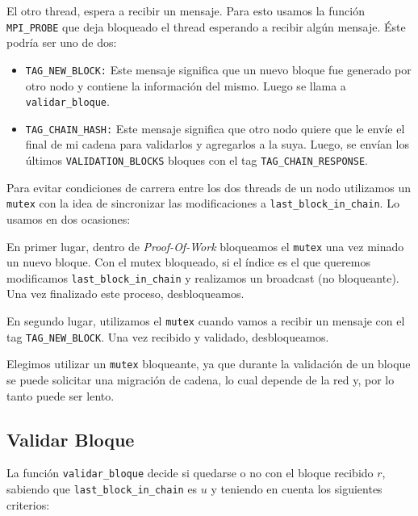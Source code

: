 El otro thread, espera a recibir un mensaje. Para esto usamos la función \texttt{MPI\_PROBE} que deja bloqueado el thread esperando a recibir algún mensaje. \'Este podría ser uno de dos: 
\begin{itemize}
	\item \texttt{TAG\_NEW\_BLOCK:} Este mensaje significa que un nuevo bloque fue generado por otro nodo y contiene la información del mismo. Luego se llama a \texttt{validar\_bloque}.
	\item \texttt{TAG\_CHAIN\_HASH:} Este mensaje significa que otro nodo quiere que le envíe el final de mi cadena para validarlos y agregarlos a la suya. Luego, se envían los últimos \texttt{VALIDATION\_BLOCKS} bloques con el tag \texttt{TAG\_CHAIN\_RESPONSE}.
\end{itemize}

Para evitar condiciones de carrera entre los dos threads de un nodo utilizamos un \texttt{mutex} con la idea de sincronizar las modificaciones a \texttt{last\_block\_in\_chain}. Lo usamos en dos ocasiones:

En primer lugar, dentro de \textit{Proof-Of-Work} bloqueamos el \texttt{mutex} una vez minado un nuevo bloque. Con el mutex bloqueado, si el índice es el que queremos modificamos \texttt{last\_block\_in\_chain} y realizamos un broadcast (no bloqueante). Una vez finalizado este proceso, desbloqueamos.

En segundo lugar, utilizamos el \texttt{mutex} cuando  vamos a recibir un mensaje con el tag \texttt{TAG\_NEW\_BLOCK}. Una vez recibido y validado, desbloqueamos.

Elegimos utilizar un \texttt{mutex} bloqueante, ya que durante la validación de un bloque se puede solicitar una migración de cadena, lo cual depende de la red y, por lo tanto puede ser lento. 

\subsection{Validar Bloque}

La función \texttt{validar\_bloque} decide si quedarse o no con el bloque recibido $r$, sabiendo que \texttt{last\_block\_in\_chain} es $u$ y teniendo en cuenta los siguientes criterios:

